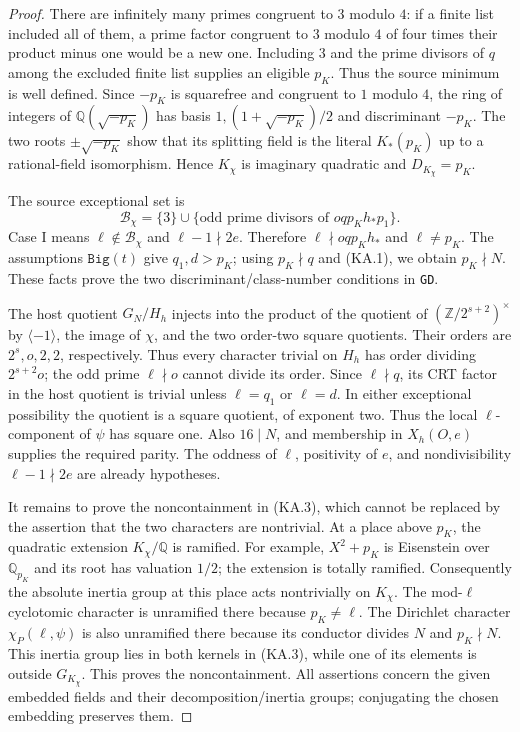\begin{proof}
There are infinitely many primes congruent to $3$ modulo $4$:
if a finite list included all of them, a prime factor congruent to
$3$ modulo $4$ of four times their product minus one would be a
new one.  Including $3$ and the prime divisors of $q$ among the
excluded finite list supplies an eligible $p_K$.  Thus the
source minimum is well defined.  Since $-p_K$ is squarefree and
congruent to $1$ modulo $4$, the ring of integers of
$\mathbb Q(\sqrt{-p_K})$ has basis
$1,(1+\sqrt{-p_K})/2$ and discriminant $-p_K$.
The two roots $\pm\sqrt{-p_K}$ show that its splitting field is
the literal $K_*(p_K)$ up to a rational-field
isomorphism.  Hence $K_\chi$ is imaginary quadratic and
$D_{K_\chi}=p_K$.

The source exceptional set is
\[
 \mathcal B_\chi=\{3\}\cup
    \{\text{odd prime divisors of }oqp_Kh_*p_1\}.
 \tag{KA.7}
\]
Case I means $\ell\notin\mathcal B_\chi$ and
$\ell-1\nmid2e$.  Therefore
$\ell\nmid oqp_Kh_*$ and $\ell\ne p_K$.
The assumptions $\texttt{Big}(t)$ give $q_1,d>p_K$;
using $p_K\nmid q$ and (KA.1), we obtain $p_K\nmid N$.
These facts prove the two discriminant/class-number conditions
in \texttt{GD}.

The host quotient $G_N/H_h$ injects into the product of the
quotient of $(\mathbb Z/2^{s+2})^\times$ by $\langle-1\rangle$,
the image of $\chi$, and the two order-two square quotients.
Their orders are $2^s,o,2,2$, respectively.  Thus every
character trivial on $H_h$ has order dividing $2^{s+2}o$;
the odd prime $\ell\nmid o$ cannot divide its order.
Since $\ell\nmid q$, its CRT factor in the host quotient is
trivial unless $\ell=q_1$ or $\ell=d$.  In either exceptional
possibility the quotient is a square quotient, of exponent two.
Thus the local $\ell$-component of $\psi$ has square one.
Also $16\mid N$, and membership in $X_h(O,e)$ supplies the
required parity.  The oddness of $\ell$, positivity of $e$,
and nondivisibility $\ell-1\nmid2e$ are already hypotheses.

It remains to prove the noncontainment in (KA.3), which cannot be
replaced by the assertion that the two characters are nontrivial.
At a place above $p_K$, the quadratic extension $K_\chi/\mathbb Q$
is ramified.  For example, $X^2+p_K$ is Eisenstein over
$\mathbb Q_{p_K}$ and its root has valuation $1/2$; the extension
is totally ramified.  Consequently the absolute inertia group
at this place acts nontrivially on $K_\chi$.
The mod-$\ell$ cyclotomic character is unramified there because
$p_K\ne\ell$.  The Dirichlet character $\chi_P(\ell,\psi)$ is
also unramified there because its conductor divides $N$ and
$p_K\nmid N$.  This inertia group lies in both kernels in
(KA.3), while one of its elements is outside $G_{K_\chi}$.
This proves the noncontainment.  All assertions concern the
given embedded fields and their decomposition/inertia groups;
conjugating the chosen embedding preserves them.
\end{proof}

